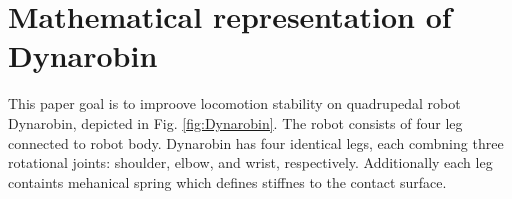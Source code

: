 
\section{Mathematical representation of Dynarobin}

This paper goal is to improove locomotion stability on quadrupedal robot Dynarobin, depicted in Fig. \ref{fig:Dynarobin}. The robot consists of four leg connected to robot body. Dynarobin has four identical legs, each combning three rotational joints: shoulder, elbow, and wrist, respectively. Additionally each leg containts mehanical spring which defines stiffnes to the contact surface.
